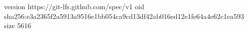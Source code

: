 version https://git-lfs.github.com/spec/v1
oid sha256:e3a2365f2a5913a9516e1bb054ca9cd13df42ab016ed12e1fe64a4e62c1ea593
size 5616

